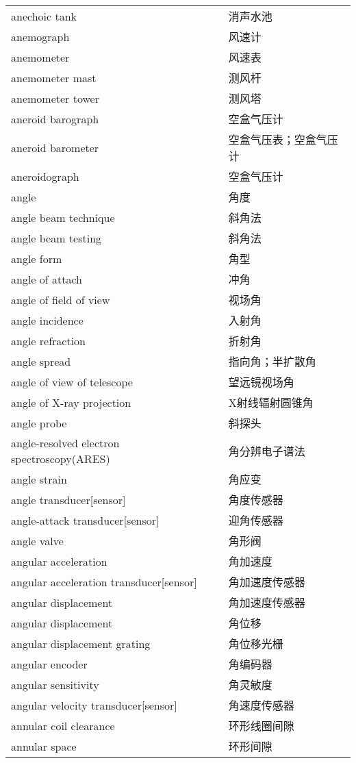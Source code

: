 \documentclass[
]{article}
\begin{document}
\begin{longtable}[]{@{}ll@{}}
anechoic tank & 消声水池 \\
anemograph & 风速计 \\
anemometer & 风速表 \\
anemometer mast & 测风杆 \\
anemometer tower & 测风塔 \\
aneroid barograph & 空盒气压计 \\
aneroid barometer & 空盒气压表；空盒气压计 \\
aneroidograph & 空盒气压计 \\
angle & 角度 \\
angle beam technique & 斜角法 \\
angle beam testing & 斜角法 \\
angle form & 角型 \\
angle of attach & 冲角 \\
angle of field of view & 视场角 \\
angle incidence & 入射角 \\
angle refraction & 折射角 \\
angle spread & 指向角；半扩散角 \\
angle of view of telescope & 望远镜视场角 \\
angle of X-ray projection & X射线辐射圆锥角 \\
angle probe & 斜探头 \\
angle-resolved electron spectroscopy(ARES) & 角分辨电子谱法 \\
angle strain & 角应变 \\
angle transducer{[}sensor{]} & 角度传感器 \\
angle-attack transducer{[}sensor{]} & 迎角传感器 \\
angle valve & 角形阀 \\
angular acceleration & 角加速度 \\
angular acceleration transducer{[}sensor{]} & 角加速度传感器 \\
angular displacement & 角加速度传感器 \\
angular displacement & 角位移 \\
angular displacement grating & 角位移光栅 \\
angular encoder & 角编码器 \\
angular sensitivity & 角灵敏度 \\
angular velocity transducer{[}sensor{]} & 角速度传感器 \\
annular coil clearance & 环形线圈间隙 \\
annular space & 环形间隙 \\

\end{longtable}
\end{document}
